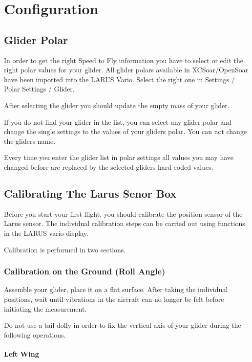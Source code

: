 \section{Configuration}
\subsection{Glider Polar}

In order to get the right Speed to Fly information you have to select or edit the right polar values for
your glider. All glider polars available in XCSoar/OpenSoar have been imported into the LARUS Vario.
Select the right one in Settings / Polar Settings / Glider.

After selecting the glider you should update the empty mass of your glider.

If you do not find your glider in the list, you can select any glider polar and change the single settings
to the values of your gliders polar. You can not change the gliders name.

Every time you enter the glider list in polar settings all values you may have changed
before are replaced by the selected gliders hard coded values.


\subsection{Calibrating The Larus Senor Box}

Before you start your first flight, you should calibrate the position sensor of the Larus sensor.
The individual calibration steps can be carried out using functions in the LARUS vario display.

Calibration is performed in two sections.


\subsubsection{Calibration on the Ground (Roll Angle)}

Assemble your glider, place it on a flat surface. After taking the individual positions, wait until
vibrations in the aircraft can no longer be felt before initiating the measurement.

Do not use a tail dolly in order to fix the vertical axis of your glider during the following operations.


\paragraph{Left Wing}

